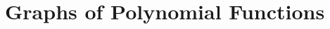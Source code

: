 \section{Graphs of Polynomial Functions}



\begin{comment}

\newpage

\section{The Remainder and Factor Theorems}



\newpage

\section{Real Zeros of Polynomials}



\newpage

\section{Complex Zeros and the Fundamental Theorem of Algebra}


\end{comment}
\newpage

